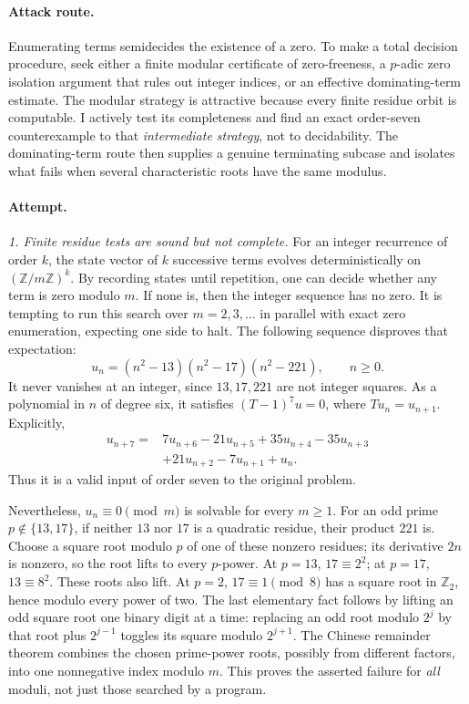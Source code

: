 \documentclass[11pt,a4paper]{article}
\newcommand{\Z}{\mathbb{Z}}
\begin{document}
\paragraph{Attack route.}
Enumerating terms semidecides the existence of a zero. To make a total
decision procedure, seek either a finite modular certificate of zero-freeness,
a $p$-adic zero isolation argument that rules out integer indices, or an
effective dominating-term estimate. The modular strategy is attractive
because every finite residue orbit is computable. I actively test its
completeness and find an exact order-seven counterexample to that
\emph{intermediate strategy}, not to decidability. The dominating-term
route then supplies a genuine terminating subcase and isolates what
fails when several characteristic roots have the same modulus.

\paragraph{Attempt.}
\textit{1. Finite residue tests are sound but not complete.}
For an integer recurrence of order $k$, the state vector of $k$ successive
terms evolves deterministically on $(\Z/m\Z)^k$. By recording states
until repetition, one can decide whether any term is zero modulo $m$.
If none is, then the integer sequence has no zero. It is tempting to run
this search over $m=2,3,\ldots$ in parallel with exact zero enumeration,
expecting one side to halt. The following sequence disproves that
expectation:
\[
 u_n=(n^2-13)(n^2-17)(n^2-221),\qquad n\ge0.                \tag{217.1}
\]
It never vanishes at an integer, since $13,17,221$ are not integer
squares. As a polynomial in $n$ of degree six, it satisfies
$(T-1)^7u=0$, where $Tu_n=u_{n+1}$. Explicitly,
\[
 \begin{split}
 u_{n+7}={}&7u_{n+6}-21u_{n+5}+35u_{n+4}-35u_{n+3}\\
          &+21u_{n+2}-7u_{n+1}+u_n.                         \end{split}\tag{217.2}
\]
Thus it is a valid input of order seven to the original problem.

Nevertheless, $u_n\equiv0\pmod m$ is solvable for every $m\ge1$.
For an odd prime $p\notin\{13,17\}$, if neither $13$ nor $17$ is a
quadratic residue, their product $221$ is. Choose a square root modulo
$p$ of one of these nonzero residues; its derivative $2n$ is nonzero,
so the root lifts to every $p$-power. At $p=13$, $17\equiv2^2$;
at $p=17$, $13\equiv8^2$. These roots also lift. At $p=2$,
$17\equiv1\pmod8$ has a square root in $\Z_2$, hence modulo every
power of two. The last elementary fact follows by lifting an odd square
root one binary digit at a time: replacing an odd root modulo $2^j$
by that root plus $2^{j-1}$ toggles its square modulo $2^{j+1}$.
The Chinese remainder theorem combines the chosen prime-power roots,
possibly from different factors, into one nonnegative index modulo $m$.
This proves the asserted failure for \emph{all} moduli, not just those
searched by a program.
\end{document}
